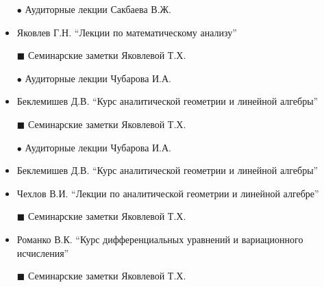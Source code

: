 \begin{itemize}[wide,  labelwidth=!, noitemsep, label=$\blacktriangleright$, labelindent = 0pt]
\item[$\bullet$]
Аудиторные лекции Сакбаева В.Ж.
\item
Яковлев Г.Н. ``Лекции по математическому анализу''
\item[$\blacksquare$]
Семинарские заметки Яковлевой Т.Х.
\end{itemize}

\begin{itemize}[wide,  labelwidth=!, noitemsep, label=$\blacktriangleright$, labelindent = 0pt]
\item[$\bullet$]
Аудиторные лекции Чубарова И.А. 
\item
Беклемишев Д.В. ``Курс аналитической геометрии и линейной алгебры''
\item[$\blacksquare$]
Семинарские заметки Яковлевой Т.Х.
\end{itemize}

\begin{itemize}[wide,  labelwidth=!, noitemsep, label=$\blacktriangleright$, labelindent = 0pt]
\item[$\bullet$]
Аудиторные лекции Чубарова И.А. 
\item
Беклемишев Д.В. ``Курс аналитической геометрии и линейной алгебры''
\item
Чехлов В.И. ``Лекции по аналитической геометрии и линейной алгебре''
\item[$\blacksquare$]
Семинарские заметки Яковлевой Т.Х.
\end{itemize}

\begin{itemize}[wide,  labelwidth=!, noitemsep, label=$\blacktriangleright$, labelindent = 0pt]
\item
Романко В.К. ``Курс дифференциальных уравнений и вариационного исчисления''
\item[$\blacksquare$]
Семинарские заметки Яковлевой Т.Х.
\end{itemize}

